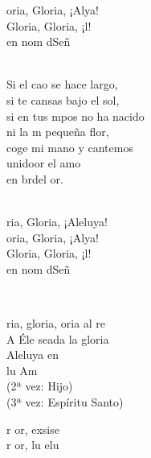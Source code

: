 \documentclass[12pt]{article}
\begin{document}
\begin{multicols*}{2}
\begin{cancion}
\begin{chorus}
	oria, Gloria, ¡Alya!\\
	Gloria, Gloria, ¡l!\\
	en nom dSeñ \\
	\end{chorus}%
	\jump\\
	Si el cao se hace largo,\\
si te cansas bajo el sol,\\
	si en tus mpos no ha nacido\\
	ni la m pequeña flor,\\
coge mi mano y cantemos\\
	unidoor el amo\\
	en brdel or. \\\jump\\
	\begin{chorus}%
	ria, Gloria, ¡Aleluya!\\
	oria, Gloria, ¡Alya!\\
	Gloria, Gloria, ¡l!\\
	en nom dSeñ \\
	\end{chorus}%
	\jump\\
\end{cancion}%

\begin{cancion}%
	ria, gloria, oria al re\\
	A Éle seada la gloria\\
	Aleluya en\\
	lu Am\\
(2ª vez: Hijo)\\
(3ª vez: Espíritu Santo)\\
\end{cancion}%

\begin{cancion}%
	r or, exsise\\
	r or, lu elu\\
\end{cancion}%


\end{multicols*}
\end{document}
